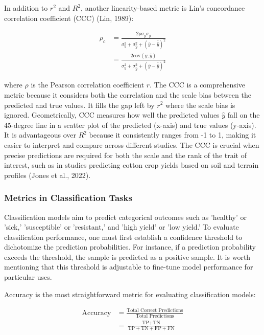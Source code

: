 In addition to \(r^2\) and \(R^2\), another linearity-based metric is Lin's concordance correlation coefficient (CCC) (Lin, 1989):

\begin{equation}
\begin{aligned}
\rho_c &= \frac{2 \rho \sigma_y \sigma_{\hat{y}}}{\sigma_y^2 + \sigma_{\hat{y}}^2 + (\bar{y} - \bar{\hat{y}})^2} \\
&= \frac{2 \text{cov}(y, \hat{y})}{\sigma_y^2 + \sigma_{\hat{y}}^2 + (\bar{y} - \bar{\hat{y}})^2}
\end{aligned}
\end{equation}

where \(\rho\) is the Pearson correlation coefficient \(r\). The CCC is a comprehensive metric because it considers both the correlation and the scale bias between the predicted and true values. It fills the gap left by \(r^2\) where the scale bias is ignored. Geometrically, CCC measures how well the predicted values \(\hat{y}\) fall on the 45-degree line in a scatter plot of the predicted (x-axis) and true values (y-axis). It is advantageous over \(R^2\) because it consistently ranges from -1 to 1, making it easier to interpret and compare across different studies. The CCC is crucial when precise predictions are required for both the scale and the rank of the trait of interest, such as in studies predicting cotton crop yields based on soil and terrain profiles (Jones et al., 2022).

\subsubsection{Metrics in Classification Tasks}

Classification models aim to predict categorical outcomes such as 'healthy' or 'sick,' 'susceptible' or 'resistant,' and 'high yield' or 'low yield.’ To evaluate classification performance, one must first establish a confidence threshold to dichotomize the prediction probabilities. For instance, if a prediction probability exceeds the threshold, the sample is predicted as a positive sample. It is worth mentioning that this threshold is adjustable to fine-tune model performance for particular uses.

Accuracy is the most straightforward metric for evaluating classification models:

\begin{equation} \label{eq_accuracy}
    \begin{split}
\text{Accuracy} &= \frac{\text{Total Correct Predictions}}{\text{Total Predictions}} \\
        &= \frac{\text{TP} + \text{TN}}{\text{TP} + \text{TN} + \text{FP} + \text{FN}}
    \end{split}
\end{equation}

